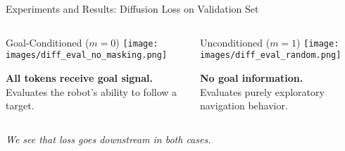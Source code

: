\documentclass{beamer}
\begin{document}
    \begin{frame}{Experiments and Results: Diffusion Loss on Validation Set}
        \begin{columns}
            \begin{column}{0.48\textwidth}
                \begin{block}{\centering Goal-Conditioned ($m = 0$)}
                    \centering
                    \texttt{[image: images/diff\_eval\_no\_masking.png]}
                    
                    \vspace{0.5em}
                    \tiny \textbf{All tokens receive goal signal.} \\
                    Evaluates the robot’s ability to follow a target.
                \end{block}
            \end{column}
            
            \begin{column}{0.48\textwidth}
                \begin{block}{\centering Unconditioned ($m = 1$)}
                    \centering
                    \texttt{[image: images/diff\_eval\_random.png]}
                    
                    \vspace{0.5em}
                    \tiny \textbf{No goal information.} \\
                    Evaluates purely exploratory navigation behavior.
                \end{block}
            \end{column}
        \end{columns}
        
        \vspace{0.7em}
        \centering
        \small \textit{We see that loss goes downstream in both cases.}
    \end{frame}
\end{document}
